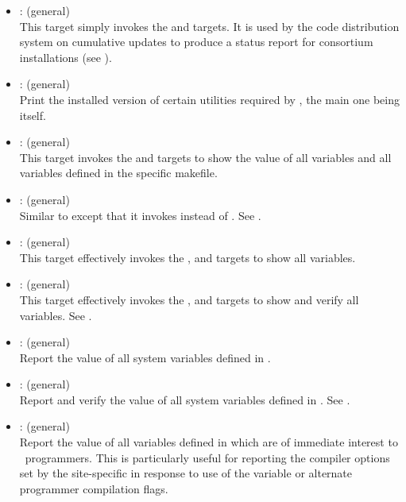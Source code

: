 \begin{itemize}
\item
    : (general)
   \\ This target simply invokes the  and 
   targets.  It is used by the code distribution system on cumulative updates
   to produce a status report for consortium installations (see
   ).

\item
    : (general)
   \\ Print the installed version of certain utilities required by \aipspp,
   the main one being  itself.

\item
    : (general)
   \\ This target invokes the  and 
   targets to show the value of all  variables and all
   variables defined in the specific makefile.

\item
    : (general)
   \\ Similar to  except that it invokes 
   instead of .  See .

\item
     : (general)
   \\ This target effectively invokes the , 
   and  targets to show all  variables.

\item
     : (general)
   \\ This target effectively invokes the , 
   and  targets to show and verify all 
   variables.  See .

\item
     : (general)
   \\ Report the value of all system variables defined in .

\item
     : (general)
   \\ Report and verify the value of all system variables defined in
   .  See .

\item
    : (general)
   \\ Report the value of all variables defined in  which are
   of immediate interest to \aipspp\ programmers.  This is particularly useful
   for reporting the compiler options set by the site-specific
    in response to use of the  variable or
   alternate programmer compilation flags.


\end{itemize}
